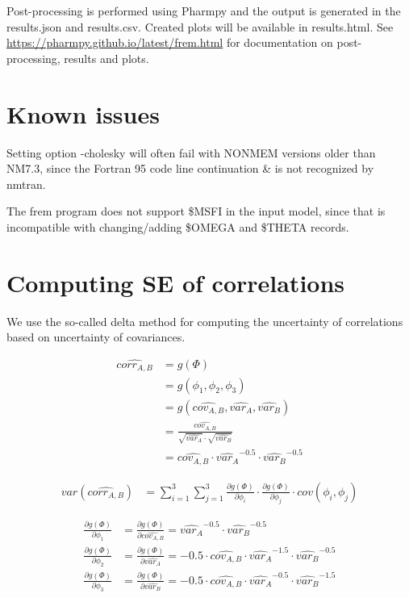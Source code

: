 \noindent Post-processing is performed using Pharmpy and the output is generated in the results.json and results.csv. Created plots will be available in results.html.
See \url{https://pharmpy.github.io/latest/frem.html} for documentation on post-processing, results and plots.

\section{Known issues}
Setting option -cholesky will often fail with NONMEM versions older than NM7.3, since the Fortran 95 code line continuation
\& is not recognized by nmtran.

The frem program does not support \$MSFI in the input model, since that is incompatible
with changing/adding \$OMEGA and \$THETA records.





\section{Computing SE of correlations}
We use the so-called delta method for computing the uncertainty of correlations based on uncertainty of covariances.

\[
\begin{split}
\hat{corr_{A,B}}&=g(\Phi)\\
&=g\left(\phi_1,\phi_2,\phi_3\right)\\
&=g\left(\hat{cov_{A,B}},\hat{var_{A}},\hat{var_{B}}\right)\\
&=\frac{\hat{cov_{A,B}}}{\sqrt{\hat{var_{A}}}\cdot \sqrt{\hat{var_{B}}}}\\
&=\hat{cov_{A,B}}\cdot \hat{var_{A}}^{-0.5} \cdot \hat{var_{B}}^{-0.5}
\end{split}
\]

\[
\begin{split}
var\left(\hat{corr_{A,B}}\right)&=\sum_{i=1}^{3}\sum_{j=1}^{3} \frac{\partial g(\Phi)}{\partial \phi_{i}} \cdot \frac{\partial g(\Phi)}{\partial \phi_{j}}\cdot cov\left(\phi_{i},\phi_{j} \right)
\end{split}
\]

\[
\begin{split}
\frac{\partial g(\Phi)}{\partial \phi_1}&=\frac{\partial g(\Phi)}{\partial \hat{cov_{A,B}}} =\hat{var_{A}}^{-0.5} \cdot \hat{var_{B}}^{-0.5}\\
\frac{\partial g(\Phi)}{\partial \phi_2}&=\frac{\partial g(\Phi)}{\partial \hat{var_{A}}} = -0.5 \cdot \hat{cov_{A,B}}\cdot \hat{var_{A}}^{-1.5} \cdot \hat{var_{B}}^{-0.5}\\
\frac{\partial g(\Phi)}{\partial \phi_3}&=\frac{\partial g(\Phi)}{\partial \hat{var_{B}}} = -0.5 \cdot \hat{cov_{A,B}}\cdot \hat{var_{A}}^{-0.5} \cdot \hat{var_{B}}^{-1.5}
\end{split}
\]

